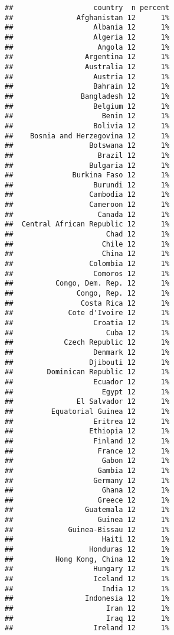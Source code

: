 \documentclass[
]{book}
\begin{document}
\begin{verbatim}
##                   country  n percent
##               Afghanistan 12      1%
##                   Albania 12      1%
##                   Algeria 12      1%
##                    Angola 12      1%
##                 Argentina 12      1%
##                 Australia 12      1%
##                   Austria 12      1%
##                   Bahrain 12      1%
##                Bangladesh 12      1%
##                   Belgium 12      1%
##                     Benin 12      1%
##                   Bolivia 12      1%
##    Bosnia and Herzegovina 12      1%
##                  Botswana 12      1%
##                    Brazil 12      1%
##                  Bulgaria 12      1%
##              Burkina Faso 12      1%
##                   Burundi 12      1%
##                  Cambodia 12      1%
##                  Cameroon 12      1%
##                    Canada 12      1%
##  Central African Republic 12      1%
##                      Chad 12      1%
##                     Chile 12      1%
##                     China 12      1%
##                  Colombia 12      1%
##                   Comoros 12      1%
##          Congo, Dem. Rep. 12      1%
##               Congo, Rep. 12      1%
##                Costa Rica 12      1%
##             Cote d'Ivoire 12      1%
##                   Croatia 12      1%
##                      Cuba 12      1%
##            Czech Republic 12      1%
##                   Denmark 12      1%
##                  Djibouti 12      1%
##        Dominican Republic 12      1%
##                   Ecuador 12      1%
##                     Egypt 12      1%
##               El Salvador 12      1%
##         Equatorial Guinea 12      1%
##                   Eritrea 12      1%
##                  Ethiopia 12      1%
##                   Finland 12      1%
##                    France 12      1%
##                     Gabon 12      1%
##                    Gambia 12      1%
##                   Germany 12      1%
##                     Ghana 12      1%
##                    Greece 12      1%
##                 Guatemala 12      1%
##                    Guinea 12      1%
##             Guinea-Bissau 12      1%
##                     Haiti 12      1%
##                  Honduras 12      1%
##          Hong Kong, China 12      1%
##                   Hungary 12      1%
##                   Iceland 12      1%
##                     India 12      1%
##                 Indonesia 12      1%
##                      Iran 12      1%
##                      Iraq 12      1%
##                   Ireland 12      1%

\end{verbatim}
\end{document}
